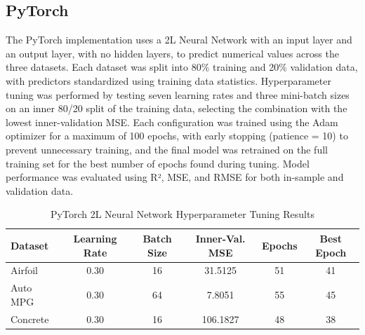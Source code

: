 \documentclass{article}
\begin{document}
\subsection{PyTorch}
The PyTorch implementation uses a 2L Neural Network with an input layer and an output layer, with no hidden layers, to predict numerical values across the three datasets. Each dataset was split into 80\% training and 20\% validation data, with predictors standardized using training data statistics. Hyperparameter tuning was performed by testing seven learning rates and three mini-batch sizes on an inner 80/20 split of the training data, selecting the combination with the lowest inner-validation MSE. Each configuration was trained using the Adam optimizer for a maximum of 100 epochs, with early stopping (patience = 10) to prevent unnecessary training, and the final model was retrained on the full training set for the best number of epochs found during tuning. Model performance was evaluated using R², MSE, and RMSE for both in-sample and validation data.
\medskip
\begin{table}[H]
    \centering
    \caption{PyTorch 2L Neural Network Hyperparameter Tuning Results}
    \label{tab:pytorch_hyperparameters}
    \small
    \begin{tabular}{lccccc}
        \hline
        \textbf{Dataset} & \textbf{Learning Rate} & \textbf{Batch Size} & \textbf{Inner-Val. MSE} & \textbf{Epochs} & \textbf{Best Epoch} \\
        \hline
        Airfoil  & 0.30 & 16 & 31.5125 & 51 & 41 \\
        Auto MPG & 0.30 & 64 & 7.8051 & 55 & 45 \\
        Concrete & 0.30 & 16 & 106.1827 & 48 & 38 \\
        \hline
    \end{tabular}
\end{table}
\end{document}
